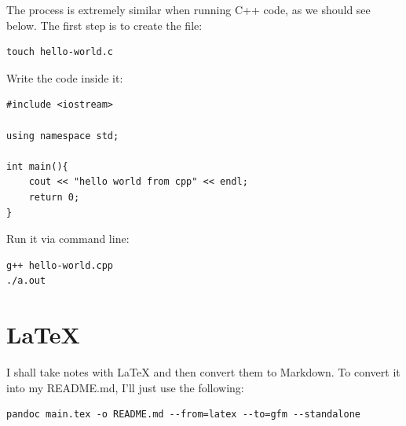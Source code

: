 \documentclass{article}
\begin{document}
The process is extremely similar when running C++ code, as we should see below. The first step is to create the file:
\begin{verbatim}
touch hello-world.c
\end{verbatim}

Write the code inside it:
\begin{verbatim}
#include <iostream>

using namespace std;

int main(){
    cout << "hello world from cpp" << endl;
    return 0;
}
\end{verbatim}

Run it via command line:
\begin{verbatim}
g++ hello-world.cpp
./a.out 
\end{verbatim}


\section{\LaTeX}
I shall take notes with \LaTeX{} and then convert them to Markdown. To convert it into my README.md, I'll just use the following:
\begin{verbatim}
pandoc main.tex -o README.md --from=latex --to=gfm --standalone
\end{verbatim}



% 
% 
\end{document}
